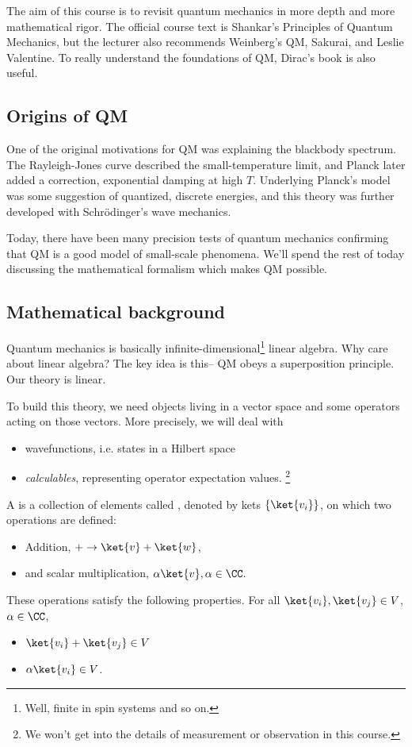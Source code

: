 The aim of this course is to revisit quantum mechanics in more depth and more mathematical rigor. The official course text is Shankar's Principles of Quantum Mechanics, but the lecturer also recommends Weinberg's QM, Sakurai, and Leslie Valentine. To really understand the foundations of QM, Dirac's book is also useful.

\subsection*{Origins of QM}
One of the original motivations for QM was explaining the blackbody spectrum. The Rayleigh-Jones curve described the small-temperature limit, and Planck later added a correction, exponential damping at high $T$. Underlying Planck's model was some suggestion of quantized, discrete energies, and this theory was further developed with Schr\"odinger's wave mechanics.

Today, there have been many precision tests of quantum mechanics confirming that QM is a good model of small-scale phenomena. We'll spend the rest of today discussing the mathematical formalism which makes QM possible.

\subsection*{Mathematical background}
Quantum mechanics is basically infinite-dimensional\footnote{Well, finite in spin systems and so on.} linear algebra. Why care about linear algebra? The key idea is this-- QM obeys a superposition principle. Our theory is linear.

To build this theory, we need objects living in a vector space and some operators acting on those vectors. More precisely, we will deal with 
\begin{itemize}
    \item wavefunctions, i.e. states in a Hilbert space
    \item \emph{calculables}, representing operator expectation values.%
        \footnote{We won't get into the details of measurement or observation in this course.}
\end{itemize}

\begin{defn}
    A  is a collection of elements called , denoted by kets $\set{\ket{v_i}}$, on which two operations are defined: 
    \begin{itemize}
        \item Addition, $+\to \ket{v}+\ket{w}$,
        \item and scalar multiplication, $\alpha \ket{v}, \alpha \in \CC.$
    \end{itemize} 
    These operations satisfy the following properties. For all $\ket{v_i},\ket{v_j}\in V$, $\alpha\in \CC$,
    \begin{itemize}
        \item $\ket{v_i}+\ket{v_j}\in V$
        \item $\alpha\ket{v_i} \in V$.
    \end{itemize}
\end{defn}

